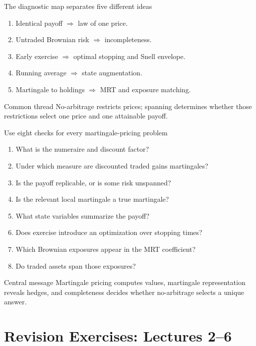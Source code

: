 \documentclass[handout,10pt,aspectratio=169]{beamer}
\newcommand{\1}{\mathbf 1}
\begin{document}
\begin{frame}{The diagnostic map separates five different ideas}
\begin{enumerate}
  \item Identical payoff \(\Rightarrow\) law of one price.
  \item Untraded Brownian risk \(\Rightarrow\) incompleteness.
  \item Early exercise \(\Rightarrow\) optimal stopping and Snell envelope.
  \item Running average \(\Rightarrow\) state augmentation.
  \item Martingale to holdings \(\Rightarrow\) MRT and exposure matching.
\end{enumerate}
\begin{block}{Common thread}
No-arbitrage restricts prices; spanning determines whether those restrictions
select one price and one attainable payoff.
\end{block}
\end{frame}

\begin{frame}{Use eight checks for every martingale-pricing problem}
\begin{enumerate}
  \item What is the numeraire and discount factor?
  \item Under which measure are discounted traded gains martingales?
  \item Is the payoff replicable, or is some risk unspanned?
  \item Is the relevant local martingale a true martingale?
  \item What state variables summarize the payoff?
  \item Does exercise introduce an optimization over stopping times?
  \item Which Brownian exposures appear in the MRT coefficient?
  \item Do traded assets span those exposures?
\end{enumerate}
\begin{block}{Central message}
Martingale pricing computes values, martingale representation reveals hedges,
and completeness decides whether no-arbitrage selects a unique answer.
\end{block}
\end{frame}

\section{Revision Exercises: Lectures 2--6}
\end{document}
